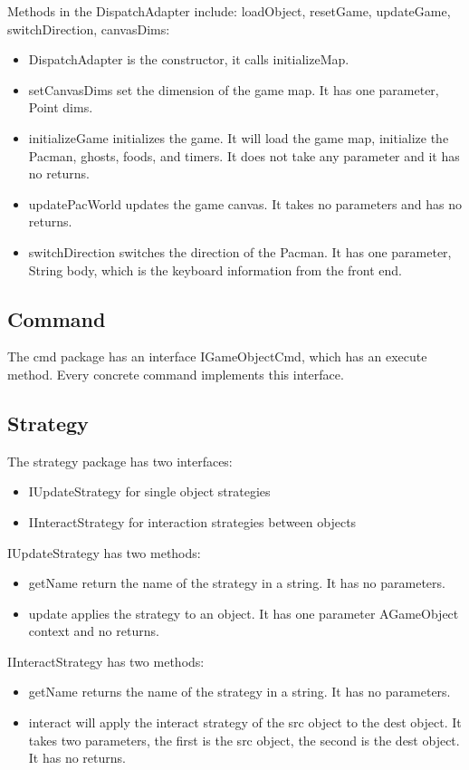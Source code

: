 \documentclass[letterpaper, 11pt]{article}
\begin{document}
Methods in the DispatchAdapter include: loadObject, resetGame, updateGame, switchDirection, canvasDims:
\begin{itemize}
\item DispatchAdapter is the constructor, it calls initializeMap.
\item setCanvasDims set the dimension of the game map. It has one parameter, Point dims. 
\item initializeGame initializes the game. It will load the game map, initialize the Pacman, ghosts, foods, and timers. It does not take any parameter and it has no returns. 
\item updatePacWorld updates the game canvas. It takes no parameters and has no returns.
\item switchDirection switches the direction of the Pacman. It has one parameter, String body, which is the keyboard information from the front end.
 \end{itemize}
 
\subsection{Command}
The cmd package has an interface IGameObjectCmd, which has an execute method. Every concrete command implements this interface. \\%

\subsection{Strategy}
The strategy package has two interfaces:
\begin{itemize}
\item IUpdateStrategy for single object strategies
\item IInteractStrategy for interaction strategies between objects
\end{itemize}

IUpdateStrategy has two methods:
\begin{itemize}
\item getName return the name of the strategy in a string. It has no parameters.
\item update applies the strategy to an object. It has one parameter AGameObject context and no returns.
 \end{itemize}

IInteractStrategy has two methods:
\begin{itemize}
\item getName returns the name of the strategy in a string. It has no parameters. 
\item interact will apply the interact strategy of the src object to the dest object. It takes two parameters, the first is the src object, the second is the dest object. It has no returns.
\end{itemize}
\end{document}
